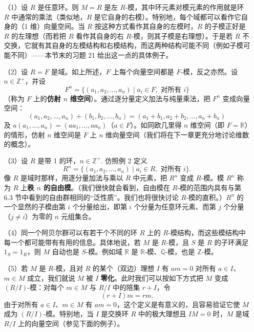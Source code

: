 \begin{example}
（1）设 \(R\) 是任意环。则 \(M = R\) 是左 \(R\)-模，其中环元素对模元素的作用就是环 \(R\) 中通常的乘法（类似地，\(R\) 是它自身的右模）。特别地，每个域都可以看作它自身的（1 维）向量空间。当 \(R\) 按这种方式看作其自身的左模时，\(R\) 的子模正好是 \(R\) 的左理想（而若把 \(R\) 看作其自身的右 \(R\)-模，则其子模是右理想）。于是若 \(R\) 不交换，它就有其自身的左模结构和右模结构，而这两种结构可能不同（例如子模可能不同）——本节末的习题 21 给出这一点的具体例子。

（2）设 \(R = F\) 是域。如上所述，\(F\) 上每个向量空间都是 \(F\)-模，反之亦然。设 \(n \in \mathbb{Z}^+\)，并设
\[
F^n = \{(a_1, a_2, \ldots, a_n) \mid a_i \in F, \text{ 对所有 } i\}
\]
（称为 \(F\) 上的\textbf{仿射 \(n\) 维空间}）。通过逐分量定义加法与纯量乘法，把 \(F^n\) 变成向量空间：
\[
(a_1, a_2, \ldots, a_n) + (b_1, b_2, \ldots, b_n) = (a_1+b_1, a_2+b_2, \ldots, a_n+b_n)
\]
及 \(a(a_1, \ldots, a_n) = (aa_1, \ldots, aa_n)\)（\(a \in F\)）。如同欧几里得 \(n\) 维空间（即 \(F = \mathbb{R}\)）的情形，仿射 \(n\) 维空间是 \(F\) 上 \(n\) 维向量空间（我们将在下一章更充分地讨论维数的概念）。

（3）设 \(R\) 是带 1 的环，\(n \in \mathbb{Z}^+\). 仿照例 2 定义
\[
R^n = \{(a_1, a_2, \ldots, a_n) \mid a_i \in R, \text{ 对所有 } i\}.
\]
像 \(R\) 是域时那样，用逐分量加法与乘以 \(R\) 中元素，把 \(R^n\) 变成 \(R\)-模。模 \(R^n\) 称为 \(R\) 上\textbf{秩 \(n\) 的自由模}。（我们很快就会看到，自由模在 \(R\)-模的范围内具有与第 6.3 节中看到的自由群相同的“泛性质”。我们也将很快讨论 \(R\)-模的直积。）\(R^n\) 的一个显然的子模由第 \(i\) 个分量给出，即第 \(i\) 个分量为任意环元素、而第 \(j\) 个分量（\(j \neq i\)）为零的 \(n\) 元组集合。

（4）同一个阿贝尔群可以有若干个不同的环 \(R\) 上的 \(R\)-模结构，而这些模结构中每一个都可能带有有用的信息。具体地说，若 \(M\) 是 \(R\)-模，且 \(S\) 是 \(R\) 的子环满足 \(1_S = 1_R\)，则 \(M\) 自动也是 \(S\)-模。例如域 \(\mathbb{R}\) 是 \(\mathbb{R}\)-模、\(\mathbb{Q}\)-模，也是 \(\mathbb{Z}\)-模。

（5）若 \(M\) 是 \(R\)-模，且对 \(R\) 的某个（双边）理想 \(I\) 有 \(am = 0\) 对所有 \(a \in I\)、\(m \in M\) 成立，我们就说 \(M\) 被 \(I\) \textbf{零化}。此时我们可以按如下方式把 \(M\) 变成 \((R/I)\)-模：对每个 \(m \in M\) 与 \(R/I\) 中的陪集 \(r+I\)，令
\[
(r+I)m = rm.
\]
由于对所有 \(a \in I\)、\(m \in M\) 有 \(am = 0\)，这个定义是有意义的，且容易验证它使 \(M\) 成为 \((R/I)\)-模。特别地，当 \(I\) 是交换环 \(R\) 中的极大理想且 \(IM = 0\) 时，\(M\) 是域 \(R/I\) 上的向量空间（参见下面的例子）。
\end{example}

